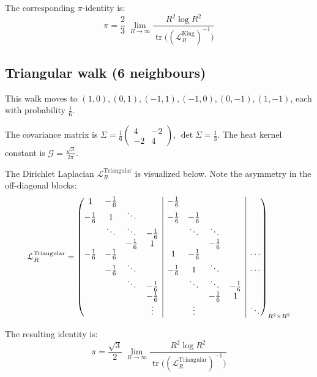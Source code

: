 \documentclass{article}
\numberwithin{equation}{section}
\theoremstyle{definition}
\theoremstyle{remark}
\newcommand{\cG}{\mathcal{G}}
\DeclareMathOperator{\tr}{tr}
\begin{document}
The corresponding $\pi$-identity is:
\begin{equation}\label{eq:King_pi}
\boxed{\;\displaystyle \pi=\frac{2}{3}\;\lim_{R\to\infty}\frac{R^{2}\log R^{2}}{\tr\!\bigl((\mathcal{L}_R^{\text{King}})^{-1}\bigr)}\;}
\end{equation}

\subsection{Triangular walk (6 neighbours)}\label{app:tri}

This walk moves to $(1,0),(0,1),(-1,1),(-1,0),(0,-1),(1,-1)$, each with probability $ \tfrac16 $.

The covariance matrix is $\Sigma=\frac{1}{6}\left(\begin{smallmatrix}4&-2\\-2&4\end{smallmatrix}\right)$, $\det\Sigma = \frac{1}{3}$. The heat kernel constant is $\cG = \frac{\sqrt{3}}{2\pi}$.

The Dirichlet Laplacian $\mathcal{L}_R^{\text{Triangular}}$ is visualized below. Note the asymmetry in the off-diagonal blocks:
\[
\mathcal{L}_R^{\text{Triangular}} =
\left(\begin{array}{@{}cccc|cccc|c@{}}
1 & -\frac{1}{6} & & & -\frac{1}{6} & & & & \\
-\frac{1}{6} & 1 & \ddots & & -\frac{1}{6} & -\frac{1}{6} & & & \\
& \ddots & \ddots & -\frac{1}{6} & & \ddots & \ddots & & \\
& & -\frac{1}{6} & 1 & & & -\frac{1}{6} & & \\
\hline
-\frac{1}{6} & -\frac{1}{6} & & & 1 & -\frac{1}{6} & & & \cdots \\
& -\frac{1}{6} & \ddots & & -\frac{1}{6} & 1 & \ddots & & \cdots \\
& & \ddots & -\frac{1}{6} & & \ddots & \ddots & -\frac{1}{6} & \\
& & & -\frac{1}{6} & & & -\frac{1}{6} & 1 & \\
\hline
& & & \vdots & & \vdots & & & \ddots
\end{array}\right)_{R^2 \times R^2}
\]

The resulting identity is:
\begin{equation}\label{eq:Tri_pi}
\boxed{\;\displaystyle \pi=\frac{\sqrt{3}}{2}\;\lim_{R\to\infty}\frac{R^{2}\log R^{2}}{\tr\!\bigl((\mathcal{L}_R^{\text{Triangular}})^{-1}\bigr)}\;}
\end{equation}
\end{document}

